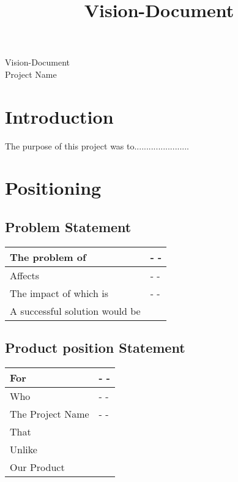 \documentclass[11pt, a4paper]{supplemental-document}
\title{Vision-Document}
\author{} %
\begin{document}
\begin{center}
 {\huge Vision-Document\\Project Name}
\end{center}

\section{Introduction}

The purpose of this project was to.......................




\section{Positioning}
\subsection{Problem Statement}

\begin{table}[H]
\centering
\begin{tabular}{||p{4cm}||p{7cm}||}
\hline

The problem of & {- \newline
- }\\
\hline
Affects & {- \newline
-  }\\
\hline
The impact of which is & {- \newline
- }\\
\hline
A successful solution would be & { }\\
\hline
\end{tabular}
\label{tab:problem statement}
 \end{table}
\subsection{Product position Statement}
\begin{table}[H]
\centering
\begin{tabular}{||p{4cm}||p{7cm}||}
\hline

For & {- \newline
- }\\
\hline
Who & {-\newline
-  }\\
\hline
The Project Name & {- \newline
- }\\
\hline
That & { }\\
\hline
\hline
Unlike & { }\\
\hline
\hline
Our Product & { }\\
\hline
\end{tabular}
\label{tab:problem statement}
 \end{table}
\end{document}
